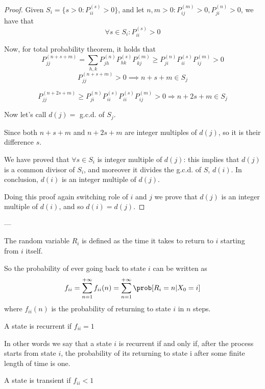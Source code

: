 	\begin{proof}
		Given $S_i = \{ s>0 : P_{ii}^{(s)} >0 \}$, and let $n, m > 0 : P_{ij}^{(m)} > 0, P_{ji}^{(n)} > 0$, we have that $$\forall s \in S_i : P_{ii}^{(s)} > 0$$

		Now, for total probability theorem, it holds that
		$$ P_{jj}^{(n+s+m)} = \sum\limits_{h, k} P_{jh}^{(n)} P_{hk}^{(s)} P_{kj}^{(m)} \geq P_{ji}^{(n)} P_{ii}^{(s)} P_{ij}^{(m)} >0 $$
		$$ P_{jj}^{(n+s+m)} >0 \implies n+s+m \in S_j$$

		$$P_{jj}^{(n+2s+m)} \geq P_{ji}^{(n)} P_{ii}^{(s)} P_{ii}^{(s)} P_{ij}^{(m)} >0 \Rightarrow n+2s+m \in S_j$$

		Now let's call $d(j) =$ g.c.d. of $S_j$.

		Since both $n+s+m$ and $n+2s+m$ are integer multiples of $d(j)$, so it is their difference $s$.

		We have proved that $\forall s \in S_i$ is integer multiple of $d(j)$: this implies that $d(j)$ is a common divisor of $S_i$, and moreover it divides the g.c.d. of $S$, $d(i)$. In conclusion, $d(i)$ is an integer multiple of $d(j)$.

		Doing this proof again switching role of $i$ and $j$ we prove that $d(j)$ is an integer multiple of $d(i)$, and so $d(i) = d(j)$.
	\end{proof}
	---

	\begin{definition}
		The random variable $R_i$ is defined as the time it takes to return to $i$ starting from $i$ itself.
	\end{definition}

	So the probability of ever going back to state $i$ can be written as
	$$ f_{ii} = \sum\limits_{n=1}^{+\infty} f_{ii}(n)  = \sum\limits_{n=1}^{+\infty} \prob[R_i=n | X_0=i] $$
	where $f_{ii}(n)$ is the probability of returning to state $i$ in $n$ steps.

	\begin{definition}
		A state is recurrent if $f_{ii} = 1$
	\end{definition}
	In other words we say that a state $i$ is recurrent if and only if, after the process starts from state $i$, the probability of its returning to state i after some finite length of time is one.

	\begin{definition}
		A state is transient if  $f_{ii} < 1$
	\end{definition}


